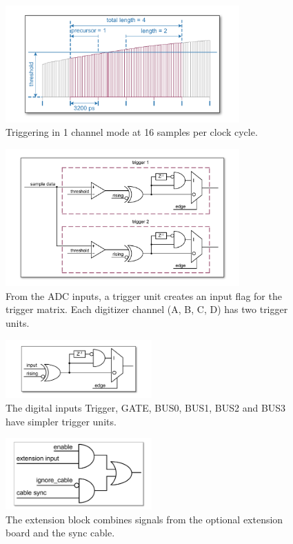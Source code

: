 \begin{figure}[ht]
    \centering
    \includegraphics[width=0.8\textwidth]{figures/1ChannelTriggering.pdf}
    \caption{Triggering in 1 channel mode at 16 samples per clock cycle.\label{fig:1ChannelTriggering}}
\end{figure}

\begin{figure}[hb]
    \centering
    \includegraphics[width=0.8\textwidth]{figures/analog-trigger.pdf}
    \caption{From the ADC inputs, a trigger unit creates an input flag for the trigger matrix. Each digitizer channel (A, B, C, D) has two trigger units.\label{fig:analog-trigger}}
\end{figure}

\begin{figure}[ht]
    \centering
    \includegraphics[width=0.5\textwidth]{figures/DigitalInput.pdf}
    \caption{The digital inputs Trigger, GATE, BUS0, BUS1, BUS2 and BUS3 have simpler trigger units.\label{fig:DigitalInput}}
\end{figure}

\begin{figure}
    \centering
    \includegraphics[width=0.5\textwidth]{figures/ExtensionBlock.pdf}
    \caption{\label{fig:ExtensionBlock} The extension block combines signals from the optional extension board and the sync cable.}
\end{figure}

